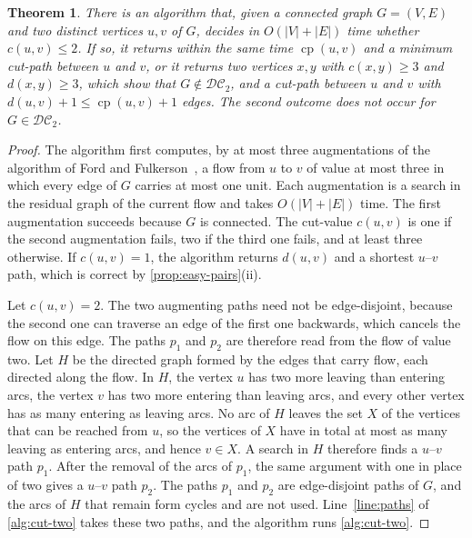 \documentclass[pdflatex,sn-mathphys-num]{sn-jnl}%
\theoremstyle{thmstyleone}%
\newtheorem{theorem}{Theorem}%
\theoremstyle{thmstyletwo}%
\theoremstyle{thmstylethree}%
\newcommand{\cp}{\operatorname{cp}}%
\newcommand{\DC}{\mathcal{DC}_2}%
\begin{document}
\begin{theorem}
\label{thm:linear-time}
There is an algorithm that, given a connected graph $G = (V, E)$ and two distinct vertices $u, v$ of $G$, decides in $O(|V| + |E|)$ time whether $c(u, v) \leq 2$.
If so, it returns within the same time $\cp(u, v)$ and a minimum cut-path between $u$ and $v$, or it returns two vertices $x, y$ with $c(x, y) \geq 3$ and $d(x, y) \geq 3$, which show that $G \notin \DC$, and a cut-path between $u$ and $v$ with $d(u, v) + 1 \leq \cp(u, v) + 1$ edges.
The second outcome does not occur for $G \in \DC$.
\end{theorem}

\begin{proof}
The algorithm first computes, by at most three augmentations of the algorithm of Ford and Fulkerson~\cite[Section~10.4]{Erickson2019Algorithms}, a flow from $u$ to $v$ of value at most three in which every edge of $G$ carries at most one unit.
Each augmentation is a search in the residual graph of the current flow and takes $O(|V| + |E|)$ time.
The first augmentation succeeds because $G$ is connected.
The cut-value $c(u, v)$ is one if the second augmentation fails, two if the third one fails, and at least three otherwise.
If $c(u, v) = 1$, the algorithm returns $d(u, v)$ and a shortest $u$--$v$ path, which is correct by \cref{prop:easy-pairs}(ii).

Let $c(u, v) = 2$.
The two augmenting paths need not be edge-disjoint, because the second one can traverse an edge of the first one backwards, which cancels the flow on this edge.
The paths $p_1$ and $p_2$ are therefore read from the flow of value two.
Let $H$ be the directed graph formed by the edges that carry flow, each directed along the flow.
In $H$, the vertex $u$ has two more leaving than entering arcs, the vertex $v$ has two more entering than leaving arcs, and every other vertex has as many entering as leaving arcs.
No arc of $H$ leaves the set $X$ of the vertices that can be reached from $u$, so the vertices of $X$ have in total at most as many leaving as entering arcs, and hence $v \in X$.
A search in $H$ therefore finds a $u$--$v$ path $p_1$.
After the removal of the arcs of $p_1$, the same argument with one in place of two gives a $u$--$v$ path $p_2$.
The paths $p_1$ and $p_2$ are edge-disjoint paths of $G$, and the arcs of $H$ that remain form cycles and are not used.
Line~\ref{line:paths} of \cref{alg:cut-two} takes these two paths, and the algorithm runs \cref{alg:cut-two}.


\end{proof}
\end{document}
